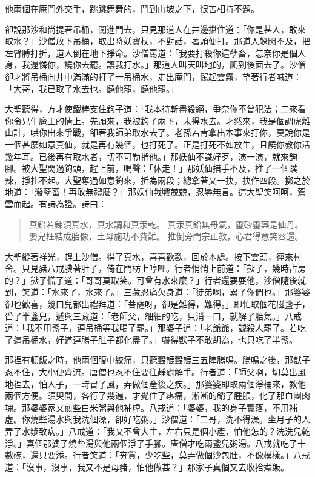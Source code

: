 他兩個在庵門外交手，跳跳舞舞的，鬥到山坡之下，恨苦相持不題。

卻說那沙和尚提著吊桶，闖進門去，只見那道人在井邊擋住道：「你是甚人，敢來取水？」沙僧放下吊桶，取出降妖寶杖，不對話，著頭便打。那道人躲閃不及，把左臂膊打折，道人倒在地下掙命。沙僧罵道：「我要打殺你這孽畜，怎奈你是個人身，我還憐你，饒你去罷。讓我打水。」那道人叫天叫地的，爬到後面去了。沙僧卻才將吊桶向井中滿滿的打了一吊桶水，走出庵門，駕起雲霧，望著行者喊道：「大哥，我已取了水去也。饒他罷，饒他罷。」

大聖聽得，方才使鐵棒支住鉤子道：「我本待斬盡殺絕，爭奈你不曾犯法；二來看你令兄牛魔王的情上。先頭來，我被鉤了兩下，未得水去。才然來，我是個調虎離山計，哄你出來爭戰，卻著我師弟取水去了。老孫若肯拿出本事來打你，莫說你是一個甚麼如意真仙，就是再有幾個，也打死了。正是打死不如放生，且饒你教你活幾年耳。已後再有取水者，切不可勒掯他。」那妖仙不識好歹，演一演，就來鉤腳。被大聖閃過鉤頭，趕上前，喝聲：「休走！」那妖仙措手不及，推了一個蹼辣，掙扎不起。大聖奪過如意鉤來，折為兩段；總拿著又一抉，抉作四段。擲之於地道：「潑孽畜！再敢無禮麼？」那妖仙戰戰兢兢，忍辱無言。這大聖笑呵呵，駕雲而起。有詩為證。詩曰：
\begin{quote}
真鉛若鍊須真水，真水調和真汞乾。
真汞真鉛無母氣，靈砂靈藥是仙丹。
嬰兒枉結成胎像，土母施功不費難。
推倒旁門宗正教，心君得意笑容還。
\end{quote}

大聖縱著祥光，趕上沙僧。得了真水，喜喜歡歡，回於本處。按下雲頭，徑來村舍。只見豬八戒腆著肚子，倚在門枋上哼哩。行者悄悄上前道：「獃子，幾時占房的？」獃子慌了道：「哥哥莫取笑。可曾有水來麼？」行者還要耍他，沙僧隨後就到，笑道：「水來了，水來了。」三藏忍痛欠身道：「徒弟啊，累了你們也。」那婆婆卻也歡喜，幾口兒都出禮拜道：「菩薩呀，卻是難得，難得。」即忙取個花磁盞子，舀了半盞兒，遞與三藏道：「老師父，細細的吃，只消一口，就解了胎氣。」八戒道：「我不用盞子，連吊桶等我喝了罷。」那婆子道：「老爺爺，諕殺人罷了。若吃了這吊桶水，好道連腸子肚子都化盡了。」嚇得獃子不敢胡為，也只吃了半盞。

那裡有頓飯之時，他兩個腹中絞痛，只聽轂轆轂轆三五陣腸鳴。腸鳴之後，那獃子忍不住，大小便齊流。唐僧也忍不住要往靜處解手。行者道：「師父啊，切莫出風地裡去，怕人子，一時冒了風，弄做個產後之疾。」那婆婆即取兩個淨桶來，教他兩個方便。須臾間，各行了幾遍，才覺住了疼痛，漸漸的銷了腫脹，化了那血團肉塊。那婆婆家又煎些白米粥與他補虛。八戒道：「婆婆，我的身子實落，不用補虛。你燒些湯水與我洗個澡，卻好吃粥。」沙僧道：「二哥，洗不得澡。坐月子的人弄了水漿致病。」八戒道：「我又不曾大生，左右只是個小產，怕他怎的？洗洗兒乾淨。」真個那婆子燒些湯與他兩個淨了手腳。唐僧才吃兩盞兒粥湯。八戒就吃了十數碗，還只要添。行者笑道：「夯貨，少吃些，莫弄做個沙包肚，不像模樣。」八戒道：「沒事，沒事，我又不是母豬，怕他做甚？」那家子真個又去收拾煮飯。

